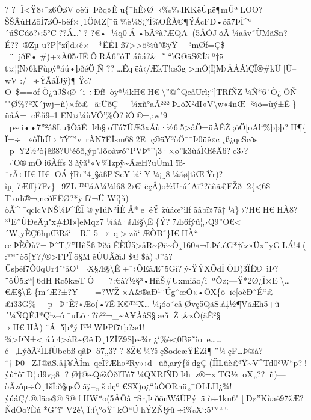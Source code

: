 ?  ?  Î\textless Ÿ8›¯z6ÔßVoèüÞðq»Êu\{¯h\textbar Ê­›Ø
‹‰‰IKKëÚµë¶mÛªLOO?ŠŠÂûHZõÍ7ßÔ-bëf×¸1ÖMZ{[}¯ü\%è¼\$¿²Í\%OÊÀ©¶ŸÅcFD•ôä7ÞÌ\^{}º´úŠCúõ?›:5°C??Á\ldots' 
?  ?€•¼q0Á•bÃºà?ÆQA(5ÅÕJõÃ¼aåv˜ÙMãSn?É??®Zµ
u?P{[}°zî{]}d»ê×¯*ËÉ1ß7\textgreater\textgreater ö¾û"®ÿŸ---³mØƒ=Ç\$
¨jðF•\#)+»À05‹IËÕRÃ6''óT áñá?\&˜``ìG@ãS®Íäª†ë t¤¦¦N›6kFùpýªáú•þðéÖ­{[}Ñ
??\ldots Éqëâ‹/ÆkT!œ3g\textgreater mÓ¦Í¦M›ÂÂÂìÇÎ®\#kÜ{[}Ú--wV
:/=÷ÝÃåÏJÿ)¶Ÿc?O~\$==õƒÒ¿üJŠ‹Ø´i÷Ðƒ!òÿª¼kH€H€\textbackslash''@\^{}QeåUrì;``{]}TRfÑZ¼Ñ*6´Ò¿ÕÑ
""Ø\%?ºX´jwj¬ñ)×fò£--ã:ÜðÇ~\_¼xñ°aÃ²²²Þ‡öX²dI«V­\textbackslash w«4nŒ-¾ö=ùý±Ê\}üåÁ=cËñ9--1E\textquotesingle N¤¼ùVÖ'\%Õ?îÓ©±‚:w"9

p\textasciitildei••7''²â8Lu\$ÕâÊÞh§oTú7ÚÆ3xÃù·½65\textgreater åÖ±üÀÊŽ;öÖ{[}oAl`\%þþþ?H¶\{Ï=÷»ôÎhÜ›­'ïÝ\^{}'v~rÀN7ËÍsm682E
ç®äY³òÖ¯¯Þ0üê«c¸ß¿qcScðs 
p\textbar Y\textbar2½²ò†êß8?U`éôõ‚ýp'Jõoàwó˜PVÞ°''¡3·×ø''k3ùáÌŒêÄ6?c3›?¬'O®­mÔi6Àfƒs
3àÿã¹«V\%Ïz­pÿ\textasciitilde ÃæH?uÛm1ïö­¨rÃ‹H€H€O Á‡Rr''4¸§àßP'SeY¼`Y¼¡¸8¼áø{]}tìŒŸr)?ìµ{]}7Æff\}7Fv\}\_9ZL™¼A¼¼l682›€'ëçÅ)o½Urú´A\textquotesingle ï??èñã£FŽð
2\{\textless6\$  + Todï®¬,neðFËØ?*ÿƒ7¬Ü
Wí¦ñ)---òÃ\^{}¯qclcVNŠ¼Þ\^{}ÊÎ@yIúN²ÍÈÅ*eéŸžúáœ²ìlƒ\textbar ãâbï»7â†¼\textbar\}­›?H€H€HÀ8?³¹EˆÙÐeÂµ"x\#ÐÏ»{]}\textbar eMqø7¼áá·šÆ§\textbackslash Ê\{Ý?7Æ6fýû¦,›Q9''O€\textless´W‚yÈÇ6hµŒRš`R\^{}-5--«--q\textgreaterzñ`¦ÆÒB˜\}I€HÀ``
œÞÈÒù7¬ÞˆT‚7''HñŠßÞðäÊÈÚ5\textgreater åR\textasciitilde Øë\textasciitilde Ò¸160«¬LÞé.éG*‡êz»Üx\^{}yGLÁ!4(:™˜òö{[}Y?/®\textgreater FPÏõ§MêÚUÃðìJ\$@\$à)J''à?Üsþëƒ7Ô0qUr4ˆ`åO¹¬X§Æ§\textbackslash Ê+˜›ÕEãÆ˜5Gí?ý-ŸÝXÕdÌÒD)3ÏË©ìÞ?¨ôÜ5kª{[}6dHRc5kæTÓ

?:\textquotesingle€à?½§³•HñŠ\#Uxmiåo/iªÔø;---Ÿ*2Ø¿Î×E\textbackslash\ldots€Æ§\textbackslash Ê\{m´Æ?±?Y\_---=?WŽ×A\&®aÐ¹¨ÚgˆœÕ«•ÔX\{öïë{[}oèÐ˜É``\textbar££í33G\%
pÞ¨È?«Æo(•7ÊK©™X\ldots¼¡óo´cåØvç5QãS.å‡½¶VãÆh5+û´¼ÑQÊJ*Ç¹z--ô¯uLö·\textquotesingle?ò²²¬\_\textasciitilde A¥ÂâS§æñŽ;\&zÔ(äÈ²§
›H€HÀ)¨Á5þ*ýI™WÞPƒ7tþ?æ1!¾\textgreater ÞN±\textlessáú4\textgreater åR\textasciitilde ØëÐ¸1ZÍZ9Sþ\textasciitilde¾r¿`\%è\textless0Bë˜ìoe\ldots\ldots é\_,LýðÃ²ÌLƒÙ\textbar bcb\textquotesingle ßqãÞö7„3? 
? 
8Ž€¼?šçŠodeæŸËZi¶¨¼çF\ldots Þ@å?ˆ†Þ0ZJ@ãS.å‡¥ÀÍm¯qcÌ?Æh»²Ry«›d¯üð‚arý\{šdgÇ(ÍÌLûè£³Ÿ\textasciitilde V\^{}Td0³W``p?!ýû‡ôïÐ¦d9vg8
? 
Ø†@\textasciitilde QéžÓðlTú7¼QXRfÑÐÞhz®¬xTG½oX„??­\textquotesingle~ñ)---òÃzôµ÷Ô¸1šÌ:ð§\textbar qsÕãÿ--„šdçº
€SX)o¿``ùÓORnü„¯OLLH¿¾!ýúáÇ/.®.läœ\$@\$@fHW*o(5ÅÕâ‡Sr,ÞðõnWáÙPýäò÷1kn6"{[}Ðø''Kùaë97žÆ?ÑdÖo?Èú*Gˆï"V2è\textbackslashÏ:í\textbackslash°oŸ'kÕªÚ­hÝZÑ!ýû÷ì‰X`:5™``\,`` 
